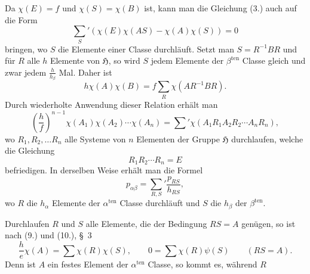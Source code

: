 \documentclass[11pt]{article}
\newcommand{\grp}{\mathfrak{H}}
\begin{document}
Da $\chi(E)=f$ und $\chi(S)=\chi(B)$ ist, kann man die Gleichung (3.) auch auf die Form
\begin{equation*}\tag{4.}
\sum_S'\left(\chi(E)\chi(AS)-\chi(A)\chi(S)\right)=0
\end{equation*}
bringen, wo $S$ die Elemente einer Classe durchläuft. Setzt man $S=R^{-1}BR$ und für $R$ alle $h$ Elemente von $\grp$, so wird $S$ jedem Elemente der $\beta^{\text{ten}}$ Classe gleich und zwar jedem $\frac{h}{h_\beta}$ Mal. Daher ist
\begin{equation*}\tag{5.}
h\chi(A)\chi(B)=f\sum_R\chi(AR^{-1}BR).
\end{equation*}
Durch wiederholte Anwendung dieser Relation erhält man
\begin{equation*}\tag{6.}
\left(\frac{h}{f}\right)^{n-1}\chi(A_1)\chi(A_2)\cdots\chi(A_n)=\sum'\chi(A_1R_1A_2R_2\cdots A_nR_n),
\end{equation*}
wo $R_1,R_2,\ldots R_n$ alle Systeme von $n$ Elementen der Gruppe $\grp$ durchlaufen, welche die Gleichung
\[
R_1R_2\cdots R_n=E
\]
befriedigen. In derselben Weise erhält man die Formel
\begin{equation*}\tag{7.}
p_{\alpha\beta}=\sum_{R,S}'\frac{p_{RS}}{h_{RS}},
\end{equation*}
wo $R$ die $h_\alpha$ Elemente der $\alpha^{\text{ten}}$ Classe durchläuft und $S$ die $h_\beta$ der $\beta^{\text{ten}}$.

Durchlaufen $R$ und $S$ alle Elemente, die der Bedingung $RS=A$ genügen, so ist nach (9.) und (10.), \S~3
\begin{equation*}\tag{8.}
\frac{h}{e}\chi(A)=\sum\chi(R)\chi(S),\qquad 0=\sum\chi(R)\psi(S)\qquad(RS=A).
\end{equation*}
Denn ist $A$ ein festes Element der $\alpha^{\text{ten}}$ Classe, so kommt es, während $R$
\end{document}
